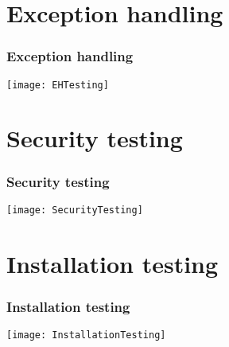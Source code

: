 \begin{figure}
\section{Exception handling}
\subsubsection{Exception handling}
\centering
\texttt{[image: EHTesting]}
\end{figure}

\begin{figure}
\section{Security testing}
\subsubsection{Security testing}
\centering
\texttt{[image: SecurityTesting]}
\end{figure}

\begin{figure}[t]
\section{Installation testing}
\subsubsection{Installation testing}
\centering
\texttt{[image: InstallationTesting]}
\end{figure}


